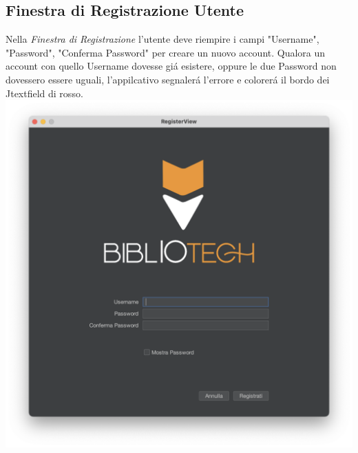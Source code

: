  \subsection{Finestra di Registrazione Utente}
 Nella \textit{Finestra di Registrazione} l'utente deve riempire i campi "Username", "Password", "Conferma Password" per creare un
 nuovo account. Qualora un account con quello Username dovesse gi\'a esistere, oppure le due Password non dovessero
 essere uguali, l'appilcativo segnaler\'a l'errore e colorer\'a il bordo dei Jtextfield di rosso.
 \includegraphics[scale=0.25, center]{Immagini/Schermate/Login_Register/RegisterPage.png}

